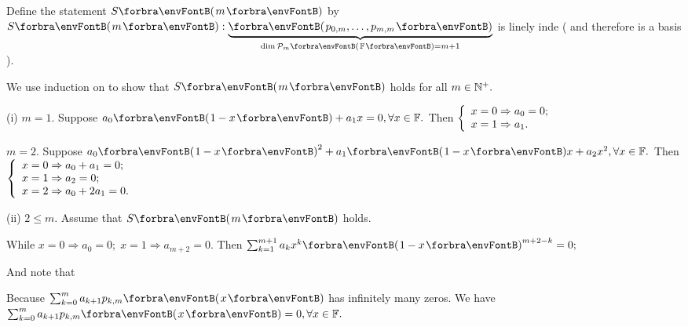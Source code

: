 \documentclass[a4paper, 11pt, UTF8]{article}
\begin{document}
\begin{large}
Define the statement $S\Par{m}$ by $S\Par{m}:\underbrace{\Par{p_{0,m},\dots,p_{m,m}}}_{\dim\PoF{m}=m+1}$ is linely inde ( and therefore is a basis ).\vspace{4pt}\par\quad
We use induction on to show that $S\Par{m}$ holds for all $m\in\Nbp.$\par\quad
(i) $m=1.$ Suppose $a_0\Par{1-x}+a_1x=0,\forall x\in\Fbb.$ Then $\MathLeftBrace{l}{x=0\Rightarrow a_0=0;\\x=1\Rightarrow a_1.}$\par\quad\Hi
$m=2.$ Suppose $a_0\Par{1-x}^2+a_1\Par{1-x}x+a_2x^2,\forall x\in\Fbb.$ Then $\MathLeftBrace{l}{x=0\Rightarrow a_0+a_1=0;\\x=1\Rightarrow a_2=0;\\x=2\Rightarrow a_0+2a_1=0.}$\par\vspace{6pt}\quad\Endi
(ii) $2\leqslant m.$ Assume that $S\Par{m}$ holds.\par\quad\Hii
{}\par\quad\Hii
{\vspace{6pt}While {\Large$x=0\Rightarrow a_0=0;\;x=1\Rightarrow a_{m+2}=0.$} Then {\Large$\sum_{k=1}^{m+1}a_kx^k\Par{1-x}^{m+2-k}=0;$}}\par\quad\Hii
{\vspace{6pt}And note that \Large{}}\vspace{10pt}\par\quad\Hii
{}\par\quad\Hii
{\vspace{6pt}Because $\sum_{k=0}^{m}a_{k+1}p_{k,m}\Par{x}$ has infinitely many zeros. We have $\sum_{k=0}^{m}a_{k+1}p_{k,m}\Par{x}=0,\forall x\in\Fbb.$}\par\quad\Hii

\end{large}
\end{document}
